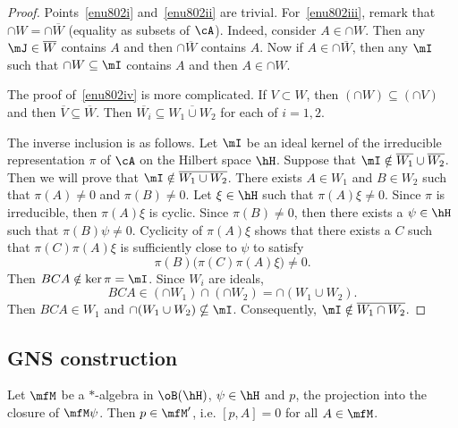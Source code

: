 \begin{proof}
	Points~\ref{enu802i}  and~\ref{enu802ii} are trivial. For~\ref{enu802iii}, remark that $\cap W=\cap\overline{ W }$ (equality as subsets of $\cA$). Indeed, consider $A\in\cap W$. Then any $\mJ\in\overline{ W }$ contains $A$ and then $\cap\overline{ W }$ contains $A$. Now if $A\in\cap\overline{ W }$, then any $\mI$ such that $\cap W\subseteq\mI$ contains $A$ and then $A\in\cap W$.

	The proof of~\ref{enu802iv} is more complicated. If $V\subset W$, then $(\cap W)\subseteq(\cap V)$ and then $\overline{ V }\subseteq\overline{ W }$. Then $\overline{ W_i }\subseteq\overline{ W_1\cup W_2 }$ for each of $i=1,2$.

	The inverse inclusion is as follows. Let $\mI$ be an ideal kernel of the irreducible representation $\pi$ of $\cA$ on the Hilbert space $\hH$. Suppose that $\mI\notin \overline{ W_1 } \cup \overline{ W_2 }$. Then we will prove that $\mI\notin\overline{ W_1\cup W_2 }$. There exists $A\in W_1$ and $B\in W_2$ such that $\pi(A)\neq 0$ and $\pi(B)\neq0$. Let $\xi\in\hH$ such that $\pi(A)\xi\neq0$. Since $\pi$ is irreducible, then $\pi(A)\xi$ is cyclic. Since $\pi(B)\neq 0$, then there exists a $\psi\in\hH$ such that $\pi(B)\psi\neq0$. Cyclicity of $\pi(A)\xi$ shows that there exists a $C$ such that $\pi(C)\pi(A)\xi$ is sufficiently close to $\psi$ to satisfy
	\[
		\pi(B)\big( \pi(C)\pi(A)\xi \big)\neq0.
	\]
	Then $BCA\notin\ker\pi=\mI$. Since $W_i$ are ideals,
	\[
		BCA\in(\cap W_1)\cap(\cap W_2)=\cap(W_1\cup W_2).
	\]
	Then $BCA\in W_1$ and $\cap(W_1\cup W_2)\nsubseteq\mI$. Consequently, $\mI\notin\overline{ W_1\cap W_2 }$.


\end{proof}


\subsection{GNS construction}

\begin{lemma}
	Let $\mfM$ be a $*$-algebra in $\oB(\hH)$, $\psi\in\hH$ and $p$, the projection into the closure of $\mfM\psi$. Then $p\in\mfM'$, i.e. $[p,A]=0$ for all $A\in\mfM$.\label{lem_preGNS}
\end{lemma}

